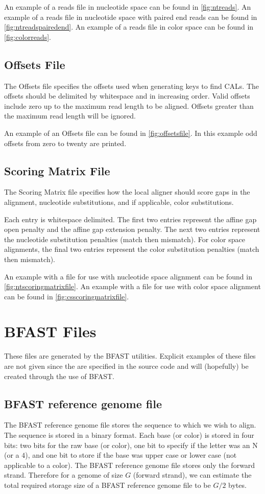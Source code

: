 \documentclass[a4paper,12pt]{book}
\newcommand{\BRGF}{BFAST reference genome file} %
\begin{document}
An example of a reads file in nucleotide space can be found in \autoref{fig:ntreads}. 
An example of a reads file in nucleotide space with paired end reads can be found in \autoref{fig:ntreadspairedend}. 
An example of a reads file in color space can be found in \autoref{fig:colorreads}. 

\subsection{Offsets File}
\label{sec:offsetsfile}
The Offsets file specifies the offsets used when generating keys to find CALs.
The offsets should be delimited by whitespace and in increasing order.
Valid offsets include zero up to the maximum read length to be aligned. 
Offsets greater than the maximum read length will be ignored.

An example of an Offsets file can be found in \autoref{fig:offsetsfile}.
In this example odd offsets from zero to twenty are printed.

\subsection{Scoring Matrix File}
\label{sec:scoringmatrixfile}
The Scoring Matrix file specifies how the local aligner should score gaps in the alignment, nucleotide substitutions, and if applicable, color substitutions.

Each entry is whitespace delimited.
The first two entries represent the affine gap open penalty and the affine gap extension penalty.
The next two entries represent the nucleotide substitution penalties (match then mismatch).
For color space alignments, the final two entries represent the color substitution penalties (match then mismatch).

An example with a file for use with nucleotide space alignment can be found in \autoref{fig:ntscoringmatrixfile}.
An example with a file for use with color space alignment can be found in \autoref{fig:csscoringmatrixfile}.

\section{BFAST Files}
These files are generated by the BFAST utilities. 
Explicit examples of these files are not given since the are specified in the source code and will (hopefully) be created through the use of BFAST.
\label{sec:bfastfiles}
\subsection{\BRGF{}}
\label{sec:brgf}
The \BRGF{} stores the sequence to which we wish to align.
The sequence is stored in a binary format.
Each base (or color) is stored in four bits: two bits for the raw base (or color), one bit to specify if the letter was an N (or a $4$), and one bit to store if the base was upper case or lower case (not applicable to a color).
The \BRGF{} stores only the forward strand.
Therefore for a genome of size $G$ (forward strand), we can estimate the total required storage size of a \BRGF{} to be $G/2$ bytes.
\end{document}

